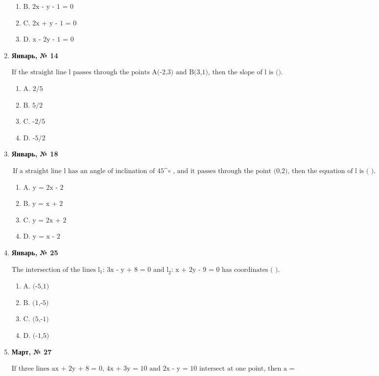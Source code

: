 \begin{enumerate}
\begin{enumerate}
\item $\displaystyle \text{B. 2x - y - 1 = 0}$
\item $\displaystyle \text{C. 2x + y - 1 = 0}$
\item $\displaystyle \text{D. x - 2y - 1 = 0}$
\end{enumerate}
\item \textbf{Январь, № 14} \par \smallskip
$\displaystyle \text{If the straight line l passes through the points A(-2,3) and B(3,1), then the slope of l is ().}$
\begin{enumerate}
\item $\displaystyle \text{A. 2/5}$
\item $\displaystyle \text{B. 5/2}$
\item $\displaystyle \text{C. -2/5}$
\item $\displaystyle \text{D. -5/2}$
\end{enumerate}
\item \textbf{Январь, № 18} \par \smallskip
$\displaystyle \text{If a straight line l has an angle of inclination of 45^}\circ\text{ , and it passes through the point (0,2), then the equation of l is ( ).}$
\begin{enumerate}
\item $\displaystyle \text{A. y = 2x - 2}$
\item $\displaystyle \text{B. y = x + 2}$
\item $\displaystyle \text{C. y = 2x + 2}$
\item $\displaystyle \text{D. y = x - 2}$
\end{enumerate}
\item \textbf{Январь, № 25} \par \smallskip
$\displaystyle \text{The intersection of the lines l}_{1}\text{: 3x - y + 8 = 0 and l}_{2}\text{: x + 2y - 9 = 0 has coordinates ( ).}$
\begin{enumerate}
\item $\displaystyle \text{A. (-5,1)}$
\item $\displaystyle \text{B. (1,-5)}$
\item $\displaystyle \text{C. (5,-1)}$
\item $\displaystyle \text{D. (-1,5)}$
\end{enumerate}
\item \textbf{Март, № 27} \par \smallskip
$\displaystyle \text{If three lines ax + 2y + 8 = 0, 4x + 3y = 10 and 2x - y = 10 intersect at one point, then a =}$

\end{enumerate}
